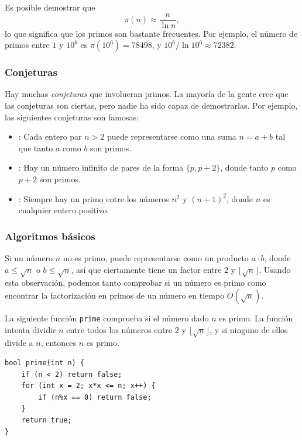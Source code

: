Es posible demostrar que
\[\pi(n) \approx \frac{n}{\ln n},\]
lo que significa que los primos son bastante frecuentes.
Por ejemplo, el número de primos entre
$1$ y $10^6$ es $\pi(10^6)=78498$,
y $10^6 / \ln 10^6 \approx 72382$.

\subsubsection{Conjeturas}

Hay muchas \emph{conjeturas} que involucran primos.
La mayoría de la gente cree que las conjeturas son ciertas,
pero nadie ha sido capaz de demostrarlas.
Por ejemplo, las siguientes conjeturas son famosas:

\begin{itemize}
\item {}:
Cada entero par $n>2$ puede representarse como una
suma $n=a+b$ tal que tanto $a$ como $b$ son primos.
\item {}:
Hay un número infinito de pares
de la forma $\{p,p+2\}$,
donde tanto $p$ como $p+2$ son primos.
\item {}:
Siempre hay un primo entre los números
$n^2$ y $(n+1)^2$, donde $n$ es cualquier entero positivo.
\end{itemize}

\subsubsection{Algoritmos básicos}

Si un número $n$ no es primo,
puede representarse como un producto $a \cdot b$,
donde $a \le \sqrt n$ o $b \le \sqrt n$,
así que ciertamente tiene un factor entre $2$ y $\lfloor \sqrt n \rfloor$.
Usando esta observación, podemos tanto comprobar
si un número es primo como encontrar la factorización en primos
de un número en tiempo $O(\sqrt n)$.

La siguiente función \texttt{prime} comprueba
si el número dado $n$ es primo.
La función intenta dividir $n$ entre
todos los números entre $2$ y $\lfloor \sqrt n \rfloor$,
y si ninguno de ellos divide a $n$, entonces $n$ es primo.

\begin{lstlisting}
bool prime(int n) {
    if (n < 2) return false;
    for (int x = 2; x*x <= n; x++) {
        if (n%x == 0) return false;
    }
    return true;
}
\end{lstlisting}

